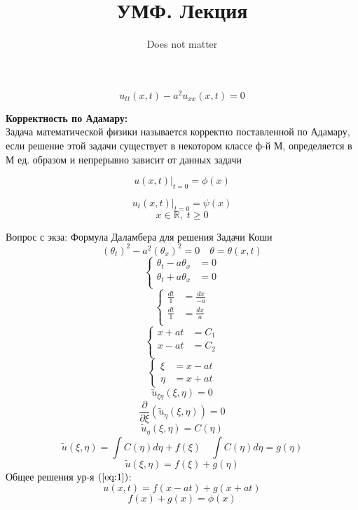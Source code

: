 \documentclass[a4paper]{article}
\begin{document}
\title{УМФ. Лекция}
\author{Does not matter}
\maketitle

\begin{equation}
    u_{tt}(x,t) - a^2 u_{xx}(x,t) = 0
    \label{eq:1}
\end{equation}

\textbf{Корректность по Адамару:}\\
Задача математической физики называется корректно поставленной по Адамару, если
решение этой задачи существует в некотором классе ф-й М, определяется в М 
ед. образом и непрерывно зависит от данных задачи

\begin{equation}
    u(x,t) |_{t=0} = \phi(x)
\end{equation}

\begin{equation}
    u_{t}(x,t) |_{t=0} = \psi(x)
\end{equation}
\[
    x \in \mathbb{R}, \; t \geq 0
\]

Вопрос с экза: Формула Даламбера для решения Задачи Коши
\[
    (\theta_{t})^2 - a^2(\theta_{x})^2 = 0 \quad \theta = \theta(x,t)
\]
\[
    \begin{cases}
        \theta_{t} - a \theta_{x} &= 0\\
        \theta_{t} + a \theta_{x} &= 0\\
    \end{cases}
\]
\[
    \begin{cases}
        \frac{dt}{1} &= \frac{dx}{-a} \\
        \frac{dt}{1} &= \frac{dx}{a} \\
    \end{cases}
\]
\[
    \begin{cases}
        x + at &= C_1 \\
        x - at &= C_2 \\
    \end{cases}
\]
\[
    \begin{cases}
        \xi &= x - at \\
        \eta &= x + at 
    \end{cases}
\]
\[
    \tilde{u}_{\xi\eta}(\xi, \eta) = 0
\]
\[
    \frac{\partial}{\partial \xi} (\tilde{u}_{\eta}(\xi, \eta)) = 0
\]
\[
    \tilde{u}_{\eta}(\xi,\eta) = C(\eta)
\]
\[
    \tilde{u}(\xi,\eta) = \int C(\eta)d\eta + f(\xi) \quad \int C(\eta)d\eta = g(\eta)
\]
\begin{equation}
    \tilde{u}(\xi,\eta) = f(\xi) + g(\eta)
\end{equation}
Общее решения ур-я $ (\ref{eq:1}) $: 
\begin{equation}
    u(x,t) = f(x-at) + g(x+at)
\end{equation}
\begin{equation}
    f(x) + g(x) = \phi(x)   
\end{equation}
\end{document}
